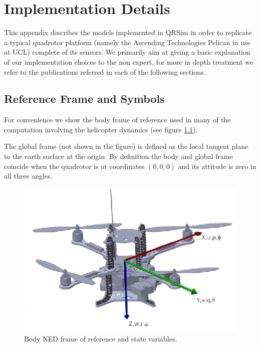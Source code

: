 \documentclass[a4paper,11pt]{report}
\newcommand{\sname}{QRSim\xspace}
\begin{document}
\appendix
\chapter{Implementation Details}

This appendix describes the models implemented in \sname in order to replicate a typical quadrotor platform (namely the Ascending Technologies Pelican \cite{asctec2011pelican} in use at UCL) complete of its sensors.
We primarily aim at giving a basic explanation of our implementation choices to the non expert, for more in depth treatment we refer to the publications referred in each of the following sections.

\section{Reference Frame and Symbols}

For convenience we show the body frame of reference used in many of the computation involving the helicopter dynamics (see figure \ref{fig:axes}).
 
The global frame (not shown in the figure) is defined as the local tangent plane to the earth surface at the origin. 
By definition the body and global frame coincide when the quadrotor is at coordinates $(0,0,0)$ and its attitude is zero in all three angles.
\begin{figure}[htbp]
 \begin{center}
 \includegraphics[width=13cm]{./axes.eps}
\caption{Body NED frame of reference and state variables.\label{fig:axes}}
\end{center}
\end{figure} 
\end{document}
